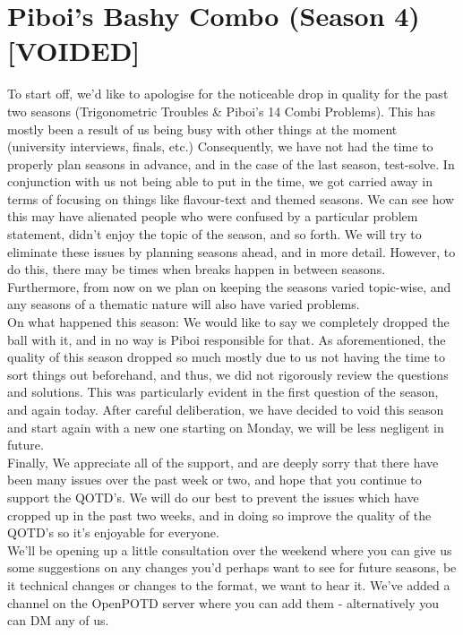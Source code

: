 \documentclass[titlepage=true]{scrartcl}
\begin{document}
\section{Piboi's Bashy Combo (Season 4) \textbf[VOIDED]}

To start off, we’d like to apologise for the noticeable drop in quality for the past two seasons (Trigonometric Troubles \& Piboi’s 14 Combi Problems). This has mostly been a result of us being busy with other things at the moment (university interviews, finals, etc.) Consequently, we have not had the time to properly plan seasons in advance, and in the case of the last season, test-solve. In conjunction with us not being able to put in the time, we got carried away in terms of focusing on things like flavour-text and themed seasons. We can see how this may have alienated people who were confused by a particular problem statement, didn’t enjoy the topic of the season, and so forth. We will try to eliminate these issues by planning seasons ahead, and in more detail. However, to do this, there may be times when breaks happen in between seasons. Furthermore, from now on we plan on keeping the seasons varied topic-wise, and any seasons of a thematic nature will also have varied problems.\\

On what happened this season: We would like to say we completely dropped the ball with it, and in no way is Piboi responsible for that. As aforementioned, the quality of this season dropped so much mostly due to us not having the time to sort things out beforehand, and thus, we did not rigorously review the questions and solutions. This was particularly evident in the first question of the season, and again today. After careful deliberation, we have decided to void this season and start again with a new one starting on Monday, we will be less negligent in future.\\

Finally, We appreciate all of the support, and are deeply sorry that there have been many issues over the past week or two, and hope that you continue to support the QOTD's. We will do our best to prevent the issues which have cropped up in the past two weeks, and in doing so improve the quality of the QOTD’s so it’s enjoyable for everyone.\\ 

We’ll be opening up a little consultation over the weekend where you can give us some suggestions on any changes you’d perhaps want to see for future seasons, be it technical changes or changes to the format, we want to hear it. We’ve added a channel on the OpenPOTD server where you can add them - alternatively you can DM any of us.\\
\end{document}
